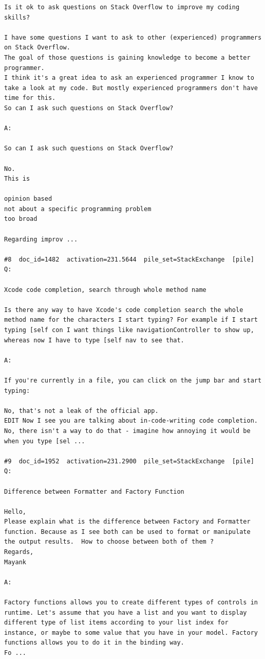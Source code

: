 \begin{verbatim}
Is it ok to ask questions on Stack Overflow to improve my coding skills?

I have some questions I want to ask to other (experienced) programmers on Stack Overflow.
The goal of those questions is gaining knowledge to become a better programmer.
I think it's a great idea to ask an experienced programmer I know to take a look at my code. But mostly experienced programmers don't have time for this. 
So can I ask such questions on Stack Overflow?

A:

So can I ask such questions on Stack Overflow?

No.
This is

opinion based 
not about a specific programming problem 
too broad

Regarding improv ...

#8  doc_id=1482  activation=231.5644  pile_set=StackExchange  [pile]
Q:

Xcode code completion, search through whole method name

Is there any way to have Xcode's code completion search the whole method name for the characters I start typing? For example if I start typing [self con I want things like navigationController to show up, whereas now I have to type [self nav to see that.

A:

If you're currently in a file, you can click on the jump bar and start typing:

No, that's not a leak of the official app.
EDIT Now I see you are talking about in-code-writing code completion. No, there isn't a way to do that - imagine how annoying it would be when you type [sel ...

#9  doc_id=1952  activation=231.2900  pile_set=StackExchange  [pile]
Q:

Difference between Formatter and Factory Function

​Hello,
Please explain what is the difference between Factory and Formatter function. Because as I see both can be used to format or manipulate the output results.  How to choose between both of them ?
Regards,
Mayank

A:

Factory functions allows you to create different types of controls in runtime. Let's assume that you have a list and you want to display different type of list items according to your list index for instance, or maybe to some value that you have in your model. Factory functions allows you to do it in the binding way. 
Fo ...


\end{verbatim}
